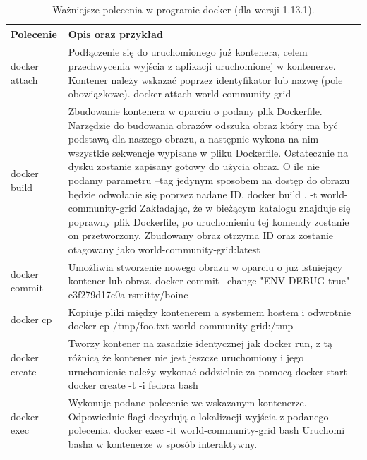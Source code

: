 \documentclass[10pt,a4paper,titlepage,twoside]{report}
\begin{document}
\begin{table}[!htbp]
\caption{Ważniejsze polecenia w programie docker (dla wersji 1.13.1). \cite{ad27}}
\label{docker_cli}
\begin{tabular}{|p{3cm}|p{11cm}|}
  \hline
  \textbf{Polecenie} & \textbf{Opis oraz przykład}\\
  \hline
  docker attach & Podłączenie się do uruchomionego już kontenera, celem przechwycenia wyjścia z aplikacji uruchomionej w kontenerze. Kontener należy wskazać poprzez identyfikator lub nazwę (pole obowiązkowe). \newline docker attach world-community-grid \\
  \hline
  docker build & Zbudowanie kontenera w oparciu o podany plik Dockerfile. Narzędzie do budowania obrazów odszuka obraz który ma być podstawą dla naszego obrazu, a następnie wykona na nim wszystkie sekwencje wypisane w pliku Dockerfile. Ostatecznie na dysku zostanie zapisany gotowy do użycia obraz. O ile nie podamy parametru –tag jedynym sposobem na dostęp do obrazu będzie odwołanie się poprzez nadane ID.
  \newline docker build . -t  world-community-grid \newline Zakładając, że w bieżącym katalogu znajduje się poprawny plik Dockerfile, po uruchomieniu tej komendy zostanie on przetworzony. Zbudowany obraz otrzyma ID oraz zostanie otagowany jako  world-community-grid:latest \\
  \hline
  docker commit & Umożliwia stworzenie nowego obrazu w oparciu o już istniejący kontener lub obraz. \newline docker commit --change "ENV DEBUG true" c3f279d17e0a rsmitty/boinc \\
  \hline
  docker cp & Kopiuje pliki między kontenerem a systemem hostem i odwrotnie \newline docker cp /tmp/foo.txt world-community-grid:/tmp \\
  \hline
  docker create & Tworzy kontener na zasadzie identycznej jak docker run, z tą różnicą że kontener nie jest jeszcze uruchomiony i jego uruchomienie należy wykonać oddzielnie za pomocą docker start \newline docker create -t -i fedora bash \\
  \hline
  docker exec & Wykonuje podane polecenie we wskazanym kontenerze. Odpowiednie flagi decydują o lokalizacji wyjścia z podanego polecenia. \newline docker exec -it  world-community-grid bash \newline Uruchomi basha w kontenerze w sposób interaktywny. \\

\end{tabular}
\end{table}
\end{document}
